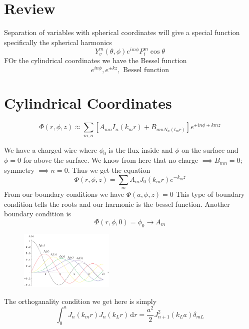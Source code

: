 \section{Review}
Separation of variables with spherical coordinates will give a special function specifically the spherical harmonics
\[
    Y_v^m (\theta , \phi ) e^{im \phi} P_i^m \cos \theta
\]
FOr the cylindrical coordinates we have the Bessel function
\[
    e^{in \phi } , e^{\pm kz}, \text{ Bessel function} 
\]
\section{Cylindrical Coordinates}
\[
    \Phi (r,\phi ,z) \approx \sum_{m,n} \left[ A_{mn} I_n (k_m r) + B_{mn N_n (l_m r)}  \right] e^{\pm in \phi  \pm kmz}
\]
\begin{eg}
We have a charged wire where \(\phi _0\)  is the flux inside and \(\phi \) on the surface and \(\phi  =0 \) for above the surface.
We know from here that no charge \(\implies B_{mn}  = 0\); symmetry \(\implies n = 0\). Thus we get the equation
\[
    \Phi (r,\phi ,z) = \sum_{m} A_m J_0 (k_m r) e^{-k_m z}
\]
From our boundary conditions we have \(\Phi (a,\phi ,z) = 0\) This type of boundary condition tells the roots and our harmonic is the bessel function. 
Another boundary condition is 
\[
    \Phi (r, \phi , 0) = \phi _0 \to A_m
\]
\begin{figure}[H]
    \centering
    \includegraphics[width=0.4\textwidth]{Figures/BesselJ_800.png}
    \caption{}
    \label{fig:}
\end{figure}
The orthoganality condition we get here is simply
\[
    \int_{0}^{a} J_n (k_m r) J_n (k_L r) \,\mathrm{d}r = \frac{a^{2}}{2} J_{n+1} ^{2}  (k_L a) \delta_{mL} 
\]
\end{eg}

